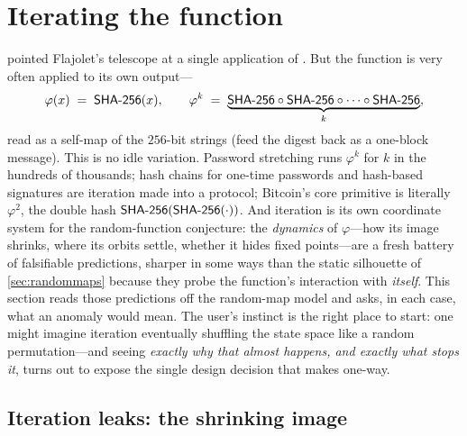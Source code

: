 \section{Iterating the function}\label{sec:iterated}

 pointed Flajolet's telescope at a single
application of \SHA{}. But the function is very often applied to its own
output---%
\[
  \varphi(x) \;=\; \textsf{SHA-256}(x), \qquad
  \varphi^{k} \;=\; \underbrace{\textsf{SHA-256} \circ \textsf{SHA-256} \circ \cdots \circ
  \textsf{SHA-256}}_{k},
\]
read as a self-map of the $256$-bit strings (feed the digest back as a
one-block message). This is no idle variation. Password stretching runs
$\varphi^{k}$ for $k$ in the hundreds of thousands; hash chains for
one-time passwords and hash-based signatures are iteration made into a
protocol; Bitcoin's core primitive is literally $\varphi^{2}$, the
double hash $\textsf{SHA-256}(\textsf{SHA-256}(\cdot))$. And iteration is its own coordinate
system for the random-function conjecture: the \emph{dynamics} of
$\varphi$---how its image shrinks, where its orbits settle, whether it
hides fixed points---are a fresh battery of falsifiable predictions,
sharper in some ways than the static silhouette of \cref{sec:randommaps}
because they probe the function's interaction with \emph{itself}. This
section reads those predictions off the random-map model and asks, in
each case, what an anomaly would mean. The user's instinct is the right
place to start: one might imagine iteration eventually shuffling the
state space like a random permutation---and seeing \emph{exactly why
that almost happens, and exactly what stops it}, turns out to expose the
single design decision that makes \SHA{} one-way.

\subsection{Iteration leaks: the shrinking image}\label{sec:shrinking}

